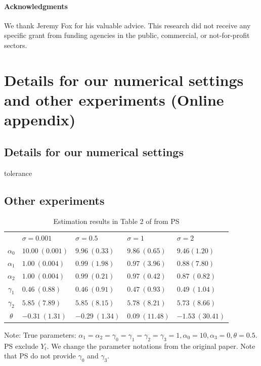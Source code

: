 \documentclass[11pt, a4paper]{article}
\begin{document}
\paragraph{Acknowledgments}
We thank Jeremy Fox for his valuable advice. This research did not receive any specific grant from funding agencies in the public, commercial, or not-for-profit sectors. 




\newpage
\appendix

\section{Details for our numerical settings and other experiments (Online appendix)}\label{sec:appendix}

\subsection{Details for our numerical settings}

tolerance


\subsection{Other experiments}

\begin{table}[!htbp]
    \caption{Estimation results in Table 2 of from PS}
    \label{tb:linear_linear_sigma_Perloff_Shen}
    \begin{center}
        \begin{tabular}{cllll}
            \hline
            & $\sigma=0.001$ & $\sigma=0.5$ & $\sigma=1$ & $\sigma=2$ \\
            $\alpha_0$ & $10.00\ (0.001)$ & $9.96\ (0.33)$ & $9.86\ (0.65)$ & $9.46 (1.20)$ \\
            $\alpha_1$ & $1.00\ (0.004)$ & $0.99\ (1.98)$ & $0.97\ (3.96)$ & $0.88 (7.80)$ \\
            $\alpha_2$ & $1.00\ (0.004)$ & $0.99\ (0.21)$ & $0.97\ (0.42)$ & $0.87\ (0.82)$ \\
            $\gamma_1$ & $0.46\ (0.88)$ & $0.46\ (0.91)$ & $0.47\ (0.93)$ & $0.49\ (1.04)$ \\
            $\gamma_2$ & $5.85\ (7.89)$ & $5.85\ (8.15)$ & $5.78\ (8.21)$ & $5.73\ (8.66)$ \\
            $\theta$ & $-0.31\ (1.31)$ & $-0.29\ (1.34)$ & $0.09\ (11.48)$ & $-1.53\ (30.41)$ \\
            \hline
        \end{tabular}
    \end{center}\footnotesize
    Note: True parameters: $\alpha_1 = \alpha_2 = \gamma_0 = \gamma_1 = \gamma_2  = \gamma_3 = 1, \alpha_0 = 10, \alpha_3 = 0,  \theta = 0.5$. PS exclude $Y_t$. We change the parameter notations from the original paper. Note that PS do not provide $\gamma_0$ and $\gamma_3$.
\end{table}
\end{document}

